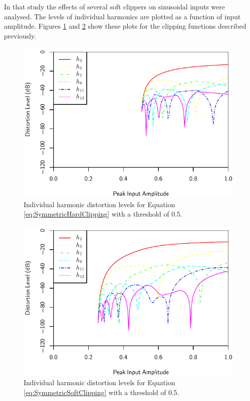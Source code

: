 			In that study the effects of several soft clippers on sinusoidal inputs were analysed. The levels
			of individual harmonics are plotted as a function of input amplitude. Figures
			\ref{fig:HardClippingHarmonics} and \ref{fig:SoftClippingHarmonics} show these plots for the
			clipping functions described previously.

			\begin{figure}[h!]
				\centering
				\includegraphics{chapter5/Images/HardClippingHarmonics.pdf}
				\caption{Individual harmonic distortion levels for Equation \ref{eq:SymmetricHardClipping}
					 with a threshold of 0.5.}
				\label{fig:HardClippingHarmonics}
			\end{figure}

			\begin{figure}[h!]
				\centering
				\includegraphics{chapter5/Images/SoftClippingHarmonics.pdf}
				\caption{Individual harmonic distortion levels for Equation \ref{eq:SymmetricSoftClipping}
					 with a threshold of 0.5.}
				\label{fig:SoftClippingHarmonics}
			\end{figure}

